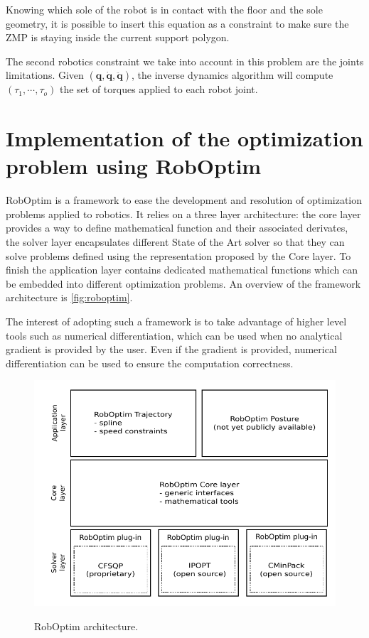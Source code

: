 \documentclass[letterpaper, 10 pt, conference]{ieeeconf}  %
\begin{document}
Knowing which sole of the robot is in contact with the floor and the
sole geometry, it is possible to insert this equation as a constraint
to make sure the ZMP is staying inside the current support polygon.


The second robotics constraint we take into account in this problem
are the joints limitations. Given $(\mathbf{q}, \dot{\mathbf{q}},
\ddot{\mathbf{q}})$, the inverse dynamics algorithm \cite{FIXME} will
compute $(\tau_1, \cdots, \tau_o)$ the set of torques applied to each
robot joint.


\section{Implementation of the optimization problem using RobOptim}
\label{sec:implementation}


RobOptim is a framework to ease the development and resolution of
optimization problems applied to robotics. It relies on a three layer
architecture: the core layer provides a way to define mathematical
function and their associated derivates, the solver layer encapsulates
different State of the Art solver so that they can solve problems
defined using the representation proposed by the Core layer. To finish
the application layer contains dedicated mathematical functions which
can be embedded into different optimization problems. An overview of
the framework architecture is \autoref{fig:roboptim}.


The interest of adopting such a framework is to take advantage of
higher level tools such as numerical differentiation, which can be
used when no analytical gradient is provided by the user. Even if the
gradient is provided, numerical differentiation can be used to ensure
the computation correctness.


\begin{figure}[htbp!]
  \includegraphics[width=\linewidth]{figure/roboptim-architecture.pdf}
  \label{fig:roboptim}
  \caption{RobOptim  architecture.}
\end{figure}
\end{document}
